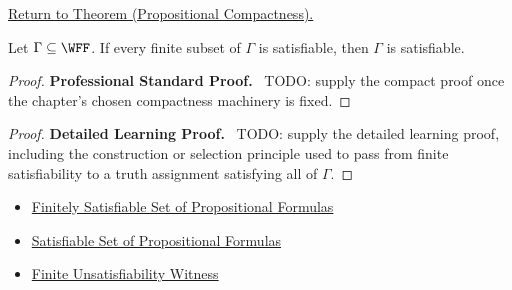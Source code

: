 \newpage
{}
\label{prf:propositional-compactness}

\begin{remark*}[Return]
\hyperref[thm:propositional-compactness]{Return to Theorem (Propositional Compactness).}
\end{remark*}

\begin{theorem*}
Let \(\Gamma\subseteq\WFF\). If every finite subset of \(\Gamma\) is
satisfiable, then \(\Gamma\) is satisfiable.
\end{theorem*}

\begin{proof}
\textbf{Professional Standard Proof.}~
TODO: supply the compact proof once the chapter's chosen compactness machinery
is fixed.
\end{proof}

\begin{proof}
\textbf{Detailed Learning Proof.}~
TODO: supply the detailed learning proof, including the construction or
selection principle used to pass from finite satisfiability to a truth
assignment satisfying all of \(\Gamma\).
\end{proof}

\begin{remark*}
\end{remark*}

\begin{dependencies}
\begin{itemize}
  \item \hyperref[def:finitely-satisfiable-set-of-propositional-formulas]{Finitely Satisfiable Set of Propositional Formulas}
  \item \hyperref[def:satisfiable-set-of-propositional-formulas]{Satisfiable Set of Propositional Formulas}
  \item \hyperref[def:finite-unsatisfiability-witness-propositional-logic]{Finite Unsatisfiability Witness}
\end{itemize}
\end{dependencies}

\clearpage
